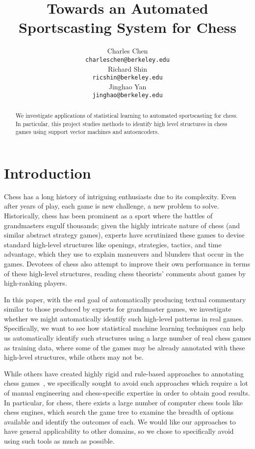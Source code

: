 \documentclass[11pt]{article}
\title{Towards an Automated Sportscasting System for Chess}
\author{
  Charles Chen \\
  {\tt charleschen@berkeley.edu} \\
\And
  Richard Shin \\
  {\tt ricshin@berkeley.edu} \\
\And
  Jinghao Yan \\
  {\tt jinghao@berkeley.edu} \\
}
\date{}
\begin{document}
\maketitle

\begin{abstract}
We investigate applications of statistical learning to automated sportscasting for chess. In particular, this project studies methods to identify high level structures in chess games using support vector machines and autoencoders. 
\end{abstract}

\section{Introduction}
Chess has a long history of intriguing enthusiasts due to its complexity. Even after years of play, each game is new challenge, a new problem to solve. Historically, chess has been prominent as a sport where the battles of grandmasters engulf thousands; given the highly intricate nature of chess (and similar abstract strategy games), experts have scrutinized these games to devise standard high-level structures like openings, strategies, tactics, and time advantage, which they use to explain maneuvers and blunders that occur in the games. Devotees of chess also attempt to improve their own performance in terms of these high-level structures, reading chess theorists' comments about games by high-ranking players. 

In this paper, with the end goal of automatically producing textual commentary similar to those produced by experts for grandmaster games, we investigate whether we might automatically identify such high-level patterns in real games. Specifically, we want to see how statistical machine learning techniques can help us automatically identify such structures using a large number of real chess games as training data, where some of the games may be already annotated with these high-level structures, while others may not be.

While others have created highly rigid and rule-based approaches to annotating chess games~\cite{cambridge-chess-annotation}, we specifically sought to avoid such approaches which require a lot of manual engineering and chess-specific expertise in order to obtain good results. In particular, for chess, there exists a large number of computer chess tools like chess engines, which search the game tree to examine the breadth of options available and identify the outcomes of each. We would like our approaches to have general applicability to other domains, so we chose to specifically avoid using such tools as much as possible. 
\end{document}
